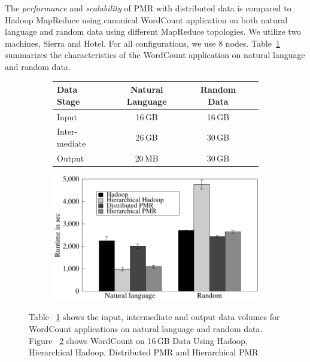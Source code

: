\documentclass[]{paper}
\begin{document}
The \textit{performance} and \textit{scalability} of PMR with distributed data is compared to Hadoop MapReduce using canonical WordCount application on both natural language and random data using different MapReduce topologies.  We utilize two machines, Sierra and Hotel. For all configurations, we use 8 nodes. Table~\ref{tab:data-volumes} summarizes the characteristics of the WordCount application on natural language and random data.

\begin{figure}[t]
	\begin{subfigure}[b]{0.5\textwidth}
                \centering
                \begin{tabular}{|p{1cm}|c|c|c|}
\hline
\textbf{Data Stage}&\textbf{Natural Language}&\textbf{Random Data}\\
\hline
Input  &16\,GB&16\,GB\\
\hline
Inter-mediate &26\,GB&30\,GB\\ 
\hline
Output &20\,MB&30\,GB\\
\hline
\end{tabular}
		
                \caption{}
                \label{tab:data-volumes}
        \end{subfigure}
	\begin{subfigure}[b]{0.5\textwidth}
                \centering
                \includegraphics[width=1\textwidth]{figures/allmrs_rands.pdf}
                \caption{}
                \label{fig:allmrs_rands}
        \end{subfigure}

	\caption{Table ~\ref{tab:data-volumes} shows the input, intermediate and output data volumes for WordCount applications on natural language and random data. Figure ~\ref{fig:allmrs_rands} shows WordCount on 16\,GB Data Using Hadoop, Hierarchical Hadoop, Distributed PMR  and Hierarchical PMR}
	\label{fig:combo}

\end{figure}
\end{document}
